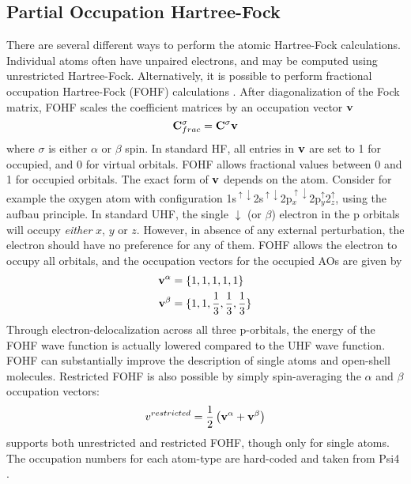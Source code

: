 \subsection{Partial Occupation Hartree-Fock}

There are several different ways to perform the atomic Hartree-Fock calculations. Individual atoms often have  unpaired electrons, and may be computed using unrestricted Hartree-Fock. Alternatively, it is possible to perform fractional occupation Hartree-Fock (FOHF) calculations \cite{Bra1980}. After diagonalization of the Fock matrix, FOHF scales the coefficient matrices by an occupation vector $\mathbf{v}$
\begin{equation}
\mathbf{C}^{\sigma}_{frac} = \mathbf{C}^{\sigma} \mathbf{v}
\end{equation} 
\noindent where $\sigma$ is either $\alpha$ or $\beta$ spin. In standard HF, all entries in $\mathbf{v}$ are set to 1 for occupied, and 0 for virtual orbitals. FOHF allows fractional values between 0 and 1 for occupied orbitals. The exact form of $\mathbf{v}$ depends on the atom. Consider for example the oxygen atom with configuration 1s$^{\uparrow\downarrow}$2s$^{\uparrow\downarrow}$2p$_x^{\uparrow\downarrow}$2p$_y^{\uparrow}$2$_z^{\uparrow}$, using the aufbau principle. In standard UHF, the single $\downarrow$ (or $\beta$) electron in the p orbitals will occupy \emph{either} $x$, $y$ or $z$. However, in absence of any external perturbation, the electron should have no preference for any of them. FOHF allows the electron to occupy all orbitals, and the occupation vectors for the occupied AOs are given by
\begin{align}
\mathbf{v}^{\alpha} &= \{1,1,1,1,1\} \\
\mathbf{v}^{\beta} &= \{1,1,\frac{1}{3},\frac{1}{3},\frac{1}{3}\}
\end{align}
\noindent Through electron-delocalization across all three p-orbitals, the energy of the FOHF wave function is actually lowered compared to the UHF wave function. FOHF can substantially improve the description of single atoms and open-shell molecules. Restricted FOHF is also possible by simply spin-averaging the $\alpha$ and $\beta$ occupation vectors:
\begin{equation}
v^{restricted} = \frac{1}{2} \left( \mathbf{v}^{\alpha} + \mathbf{v}^{\beta} \right)
\end{equation}
\noindent \mchem{} supports both unrestricted and restricted FOHF, though only for single atoms. The occupation numbers for each atom-type are hard-coded and taken from Psi4 \cite{Tur2012}.

